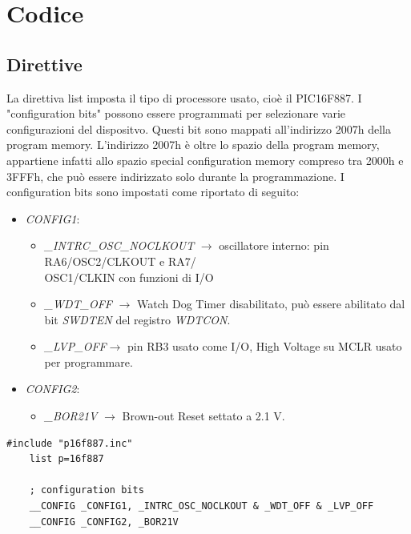 \documentclass{article}
\begin{document}
	\section{Codice}
	\subsection{Direttive}
	La direttiva list imposta il tipo di processore usato, cioè il PIC16F887. I "configuration bits" possono essere programmati per selezionare varie configurazioni del dispositvo. Questi bit sono mappati all'indirizzo 2007h della program memory. L'indirizzo 2007h è oltre lo spazio della program memory, appartiene infatti allo spazio special configuration memory compreso tra 2000h e 3FFFh, che può essere indirizzato solo durante la programmazione. I configuration bits sono impostati come riportato di seguito:
	\begin{itemize}
		\item \emph{CONFIG1}:
		\begin{itemize}
			\item \emph{\_INTRC\_OSC\_NOCLKOUT} $\rightarrow$ oscillatore interno: pin RA6/OSC2/CLKOUT e RA7/\\OSC1/CLKIN con funzioni di I/O
			
			\item \emph{\_WDT\_OFF} $\rightarrow$ Watch Dog Timer disabilitato, può essere abilitato dal bit \emph{SWDTEN} del registro \emph{WDTCON}.
			
			\item \emph{\_LVP\_OFF}$\rightarrow$ pin RB3 usato come I/O, High Voltage su MCLR usato per programmare.
		\end{itemize}
		\item \emph{CONFIG2}:
		\begin{itemize}
			\item 	\emph{\_BOR21V} $\rightarrow$ Brown-out Reset settato a 2.1 V.
		\end{itemize}
	\end{itemize}

	\begin{lstlisting}[frame=single] 
	#include "p16f887.inc"
	list p=16f887
	
	; configuration bits
	__CONFIG _CONFIG1, _INTRC_OSC_NOCLKOUT & _WDT_OFF & _LVP_OFF
	__CONFIG _CONFIG2, _BOR21V
	\end{lstlisting}
	
	
\end{document}
